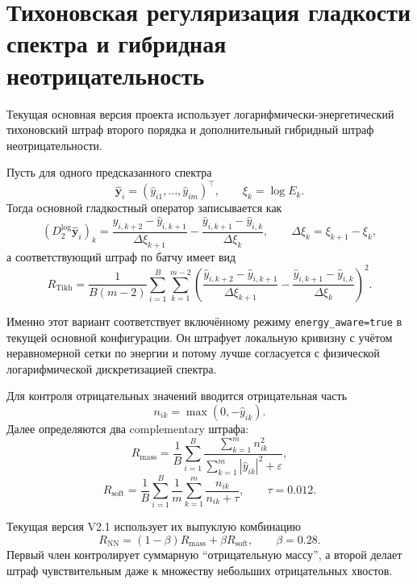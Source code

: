 \documentclass[11pt]{article}
\begin{document}
\section{Тихоновская регуляризация гладкости спектра и гибридная неотрицательность}

Текущая основная версия проекта использует логарифмически-энергетический тихоновский штраф второго порядка и дополнительный гибридный штраф неотрицательности.

Пусть для одного предсказанного спектра
\begin{equation}
\hat{\mathbf{y}}_i = (\hat{y}_{i1},\dots,\hat{y}_{im})^\top,
\qquad
\xi_k = \log E_k.
\end{equation}
Тогда основной гладкостный оператор записывается как
\begin{equation}
\left(D^{\log}_2\hat{\mathbf{y}}_i\right)_k =
\frac{\hat{y}_{i,k+2}-\hat{y}_{i,k+1}}{\Delta \xi_{k+1}}
-
\frac{\hat{y}_{i,k+1}-\hat{y}_{i,k}}{\Delta \xi_k},
\qquad
\Delta \xi_k = \xi_{k+1}-\xi_k,
\end{equation}
а соответствующий штраф по батчу имеет вид
\begin{equation}
R_{\mathrm{Tikh}} = \frac{1}{B(m-2)} \sum_{i=1}^{B} \sum_{k=1}^{m-2}
\left(
\frac{\hat{y}_{i,k+2}-\hat{y}_{i,k+1}}{\Delta \xi_{k+1}}
-
\frac{\hat{y}_{i,k+1}-\hat{y}_{i,k}}{\Delta \xi_k}
\right)^2.
\end{equation}

Именно этот вариант соответствует включённому режиму \texttt{energy\_aware=true} в текущей основной конфигурации. Он штрафует локальную кривизну с учётом неравномерной сетки по энергии и потому лучше согласуется с физической логарифмической дискретизацией спектра.

Для контроля отрицательных значений вводится отрицательная часть
\begin{equation}
n_{ik} = \max(0,-\hat{y}_{ik}).
\end{equation}
Далее определяются два complementary штрафа:
\begin{equation}
R_{\mathrm{mass}} =
\frac{1}{B}\sum_{i=1}^{B}
\frac{\sum_{k=1}^{m} n_{ik}^{2}}{\sum_{k=1}^{m}|\hat{y}_{ik}|^{2}+\varepsilon},
\end{equation}
\begin{equation}
R_{\mathrm{soft}} =
\frac{1}{B}\sum_{i=1}^{B}\frac{1}{m}\sum_{k=1}^{m}
\frac{n_{ik}}{n_{ik}+\tau},
\qquad
\tau = 0.012.
\end{equation}

Текущая версия V2.1 использует их выпуклую комбинацию
\begin{equation}
R_{\mathrm{NN}} = (1-\beta)R_{\mathrm{mass}} + \beta R_{\mathrm{soft}},
\qquad
\beta = 0.28.
\end{equation}
Первый член контролирует суммарную ``отрицательную массу'', а второй делает штраф чувствительным даже к множеству небольших отрицательных хвостов.
\end{document}
